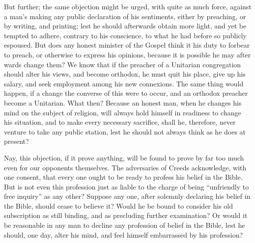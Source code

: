 \documentclass[
]{book}
\begin{document}
But further; the same objection might be urged, with quite as much force, against a man's making any public declaration of his sentiments, either by preaching, or by writing, and printing; lest he should afterwards obtain more light, and yet be tempted to adhere, contrary to his conscience, to what he had before so publicly espoused. But does any honest minister of the Gospel think it his duty to forbear to preach, or otherwise to express his opinions, because it is possible he may after wards change them? We know that if the preacher of a Unitarian congregation should alter his views, and become orthodox, he must quit his place, give up his salary, and seek employment among his new connexions. The same thing would happen, if a change the converse of this were to occur, and an orthodox preacher become a Unitarian. What then? Because an honest man, when he changes his mind on the subject of religion, will always hold himself in readiness to change his situation, and to make every necessary sacrifice, shall he, therefore, never venture to take any public station, lest he should not always think as he does at present?

Nay, this objection, if it prove anything, will be found to prove by far too much even for our opponents themselves. The adversaries of Creeds acknowledge, with one consent, that every one ought to be ready to profess his belief in the Bible. But is not even this profession just as liable to the charge of being ``unfriendly to free inquiry'' as any other? Suppose any one, after solemnly declaring his belief in the Bible, should cease to believe it? Would he be bound to consider his old subscription as still binding, and as precluding further examination? Or would it be reasonable in any man to decline any profession of belief in the Bible, lest he should, one day, alter his mind, and feel himself embarrassed by his profession?
\end{document}

